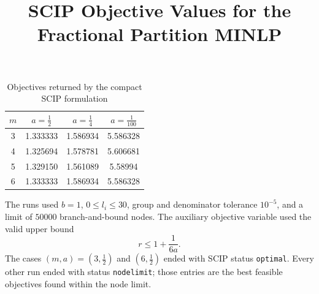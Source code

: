 \documentclass[11pt]{article}
\title{SCIP Objective Values for the Fractional Partition MINLP}
\author{}
\date{}
\begin{document}
\maketitle

\begin{table}[htbp]
  \centering
  \caption{Objectives returned by the compact SCIP formulation}
  \label{tab:fractional-partition-objectives}
  \begin{tabular}{
    c
    S[table-format=1.9]
    S[table-format=1.9]
    S[table-format=1.9]
  }
    \toprule
    {$m$} & {$a=\frac{1}{2}$} & {$a=\frac{1}{4}$} & {$a=\frac{1}{100}$} \\
     & 1.333333 & 1.586934 & 5.586328 \\
    4 & 1.325694 & 1.578781 & 5.606681 \\
    5 & 1.329150 & 1.561089 & 5.58994 \\
    6 & 1.333333 & 1.586934 & 5.586328 \\
    \bottomrule
  \end{tabular}
\end{table}

\noindent
The runs used \(b=1\), \(0\leq l_i\leq 30\), group and denominator
tolerance \(10^{-5}\), and a limit of \(50000\) branch-and-bound nodes.
The auxiliary objective variable used the valid upper bound
\[
  r \leq 1+\frac{1}{6a}.
\]
The cases \((m,a)=(3,\frac12)\) and \((6,\frac12)\) ended with SCIP
status \texttt{optimal}. Every other run ended with status
\texttt{nodelimit}; those entries are the best feasible objectives found
within the node limit.
\end{document}

